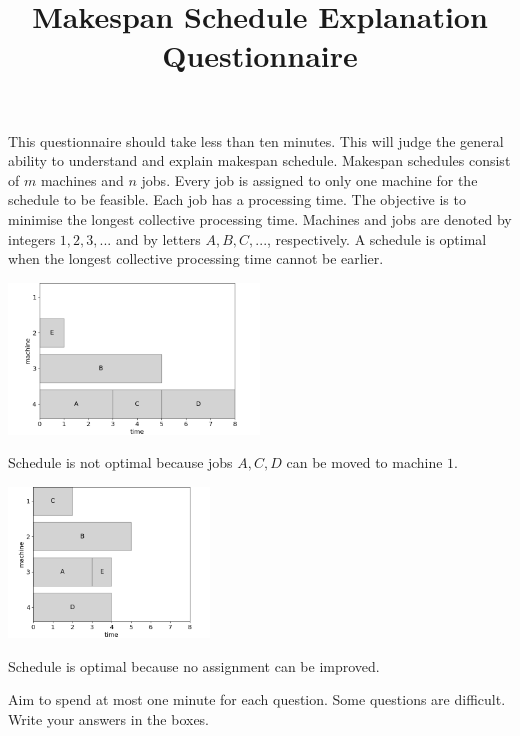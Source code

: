 \documentclass[10pt,a4paper]{article}
\title{\textbf{Makespan Schedule Explanation Questionnaire}}
\date{}
\author{}
\begin{document}
\maketitle
\vspace{-4\baselineskip}
\noindent\hrulefill

\noindent This questionnaire should take less than ten minutes. This will judge the general ability to understand and explain makespan schedule. Makespan schedules consist of $m$ machines and $n $ jobs. Every job is assigned to only one machine for the schedule to be feasible. Each job has a processing time. The objective is to minimise the longest collective processing time. Machines and jobs are denoted by integers $1,2,3,...$ and by letters $A,B,C,...$, respectively. A schedule is optimal when the longest collective processing time cannot be earlier.

\begin{multicols}{2}
	\includegraphics[width=0.5\textwidth]{figures/makespan_unoptimal}
	\begin{center}
		Schedule is not optimal because jobs $A,C,D$ can be moved to machine $1$.
	\end{center}
	\includegraphics[width=0.4\textwidth]{figures/makespan_optimal}
	\begin{center}
		Schedule is optimal because no assignment can be improved.
	\end{center}
\end{multicols}

\vspace{-\baselineskip}
\noindent\hrulefill

\noindent Aim to spend at most one minute for each question. Some questions are difficult. Write your answers in the boxes.
\end{document}
